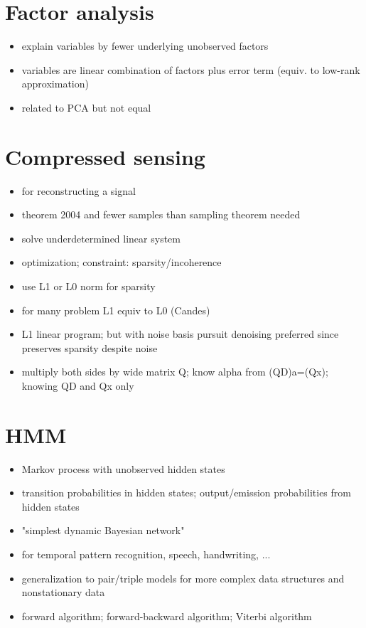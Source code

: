 \documentclass{article}
\begin{document}
\begin{multicols}{3}
\section{Factor analysis}
\begin{itemize}
\item explain variables by fewer underlying unobserved factors
\item variables are linear combination of factors plus error term (equiv. to low-rank approximation)
\item related to PCA but not equal
\end{itemize}

\section{Compressed sensing}
\begin{itemize}
\item for reconstructing a signal
\item theorem 2004 and fewer samples than sampling theorem needed
\item solve underdetermined linear system
\item optimization; constraint: sparsity/incoherence
\item use L1 or L0 norm for sparsity
\item for many problem L1 equiv to L0 (Candes)
\item L1 linear program; but with noise basis pursuit denoising preferred since preserves sparsity despite noise
\item multiply both sides by wide matrix Q; know alpha from (QD)a=(Qx); knowing QD and Qx only
\end{itemize}

\section{HMM}
\begin{itemize}
\item Markov process with unobserved hidden states
\item transition probabilities in hidden states; output/emission probabilities from hidden states
\item "simplest dynamic Bayesian network"
\item for temporal pattern recognition, speech, handwriting, ...
\item generalization to pair/triple models for more complex data structures and nonstationary data
\item forward algorithm; forward-backward algorithm; Viterbi algorithm
\end{itemize}


\end{multicols}
\end{document}

